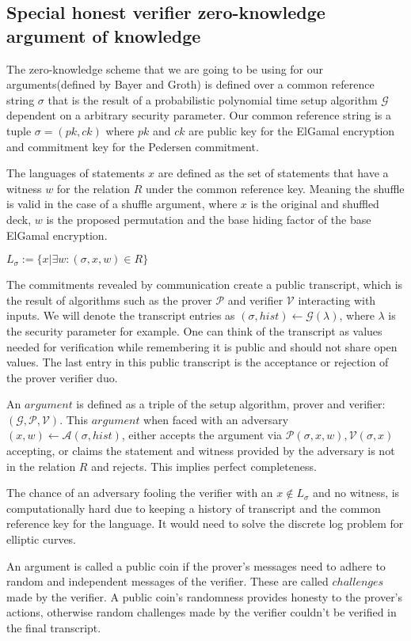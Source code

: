 \documentclass[12pt,a4paper]{report}
\begin{document}
\subsection*{Special honest verifier zero-knowledge argument of knowledge}
The zero-knowledge scheme that we are going to be using for our arguments(defined by Bayer and Groth) is defined over a common reference string $\sigma$ that is the result of a probabilistic polynomial time setup algorithm $\mathcal{G}$ dependent on a arbitrary security parameter.
Our common reference string is a tuple $\sigma = (pk, ck)$ where $pk$ and $ck$ are public key for the ElGamal encryption and commitment key for the Pedersen commitment.\par
The languages of statements $x$ are defined as the set of statements that have a witness $w$ for the relation $R$ under the common reference key. Meaning the shuffle is valid in the case of a shuffle argument, where $x$ is the original and shuffled deck, $w$ is the proposed permutation and the base hiding factor of the base ElGamal encryption.
\begin{center}
	$L_\sigma := \{x | \exists w : (\sigma, x, w) \in R\}$
\end{center}
The commitments revealed by communication create a public transcript, which is the result of algorithms such as the prover $\mathcal{P}$ and verifier $\mathcal{V}$ interacting with inputs. We will denote the transcript entries as $(\sigma, hist) \leftarrow \mathcal{G}(\lambda)$, where $\lambda$ is the security parameter for example.
One can think of the transcript as values needed for verification while remembering it is public and should not share open values. 
The last entry in this public transcript is the acceptance or rejection of the prover verifier duo.\par
An $argument$ is defined as a triple of the setup algorithm, prover and verifier: $(\mathcal{G}, \mathcal{P}, \mathcal{V})$.
This $argument$ when faced with an adversary $(x, w) \leftarrow \mathcal{A}(\sigma, hist)$, either accepts the argument via $\mathcal{P}(\sigma, x, w), \mathcal{V}(\sigma, x)$ accepting, 
or claims the statement and witness provided by the adversary is not in the relation $R$ and rejects. 
This implies perfect completeness.\par
The chance of an adversary fooling the verifier with an $x \notin L_\sigma$ and no witness, is computationally hard due to keeping a history of transcript and the common reference key for the language. It would need to solve the discrete log problem for elliptic curves.\par
An argument is called a public coin if the prover's messages need to adhere to random and independent messages of the verifier. These are called $challenges$ made by the verifier.
A public coin's randomness provides honesty to the prover's actions, otherwise random challenges made by the verifier couldn't be verified in the final transcript.
\end{document}

